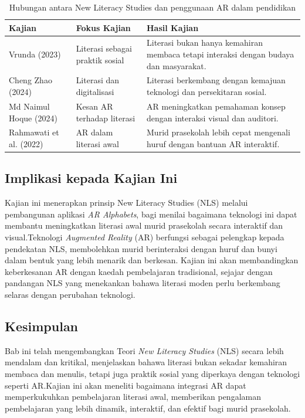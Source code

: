 \begin{table}[htbp]
    \centering
    \caption{Hubungan antara New Literacy Studies dan penggunaan AR dalam pendidikan}
    \label{tab:literacy-ar}
    \begin{tabularx}{\textwidth}{l l X}
        \toprule
        \textbf{Kajian} & \textbf{Fokus Kajian} & \textbf{Hasil Kajian} \\
        \midrule
        Vrunda (2023) & Literasi sebagai praktik sosial & Literasi bukan hanya kemahiran membaca tetapi interaksi dengan budaya dan masyarakat. \\
        Cheng Zhao (2024) & Literasi dan digitalisasi & Literasi berkembang dengan kemajuan teknologi dan persekitaran sosial. \\
       Md Naimul Hoque (2024) & Kesan AR terhadap literasi & AR meningkatkan pemahaman konsep dengan interaksi visual dan auditori. \\
        Rahmawati et al. (2022) & AR dalam literasi awal & Murid prasekolah lebih cepat mengenali huruf dengan bantuan AR interaktif. \\
        \bottomrule
    \end{tabularx}
\end{table}



\subsection{Implikasi kepada Kajian Ini}
Kajian ini menerapkan prinsip New Literacy Studies (NLS) melalui pembangunan aplikasi \textit{AR Alphabets}, bagi menilai bagaimana teknologi ini dapat membantu meningkatkan literasi awal murid prasekolah secara interaktif dan visual.Teknologi \textit{Augmented Reality} (AR) berfungsi sebagai pelengkap kepada pendekatan NLS, membolehkan murid berinteraksi dengan huruf dan bunyi dalam bentuk yang lebih menarik dan berkesan. Kajian ini akan membandingkan keberkesanan AR dengan kaedah pembelajaran tradisional, sejajar dengan pandangan NLS yang menekankan bahawa literasi moden perlu berkembang selaras dengan perubahan teknologi.

\subsection{Kesimpulan}
Bab ini telah mengembangkan Teori \textit{New Literacy Studies} (NLS) secara lebih mendalam dan kritikal, menjelaskan bahawa literasi bukan sekadar kemahiran membaca dan menulis, tetapi juga praktik sosial yang diperkaya dengan teknologi seperti AR.Kajian ini akan meneliti bagaimana integrasi AR dapat memperkukuhkan pembelajaran literasi awal, memberikan pengalaman pembelajaran yang lebih dinamik, interaktif, dan efektif bagi murid prasekolah.

